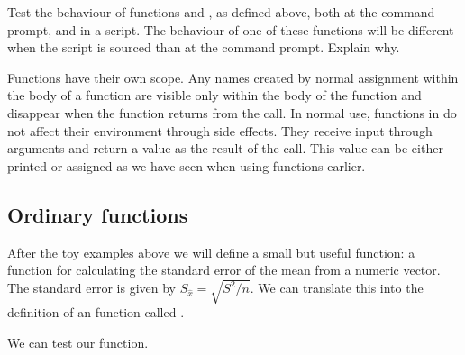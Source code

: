 \documentclass[krantz2]{krantz}\usepackage{knitr}%
\begin{document}
\begin{advplayground}
Test the behaviour of functions  and , as defined above, both at the command prompt, and in a script. The behaviour of one of these functions will be different when the script is sourced than at the command prompt. Explain why.
\end{advplayground}

Functions have their own scope. Any names created by normal assignment within the body of a function are visible only within the body of the function and disappear when the function returns from the call. In normal use, functions in \Rlang do not affect their environment through side effects. They receive input through arguments and return a value as the result of the call. This value can be either printed or assigned as we have seen when using functions earlier.

\subsection{Ordinary functions}

After the toy examples above we will define a small but useful function: a function for calculating the standard error of the mean from a numeric vector. The standard error is given by $S_{\hat{x}} = \sqrt{S^2 / n}$. We can translate this into the definition of an \Rlang function called .

\begin{knitrout}\footnotesize
{}\color{fgcolor}\begin{kframe}
\begin{alltt}
 \hlkwb{<-} \hlstd{(}\hlstd{)\{}\hlstd{(} \hlopt{/} 
\end{alltt}
\end{kframe}
\end{knitrout}

We can test our function.
\end{document}
